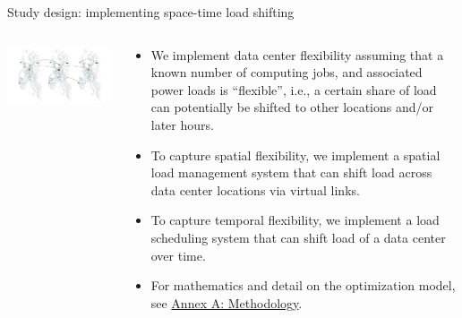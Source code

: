 \begin{frame}{Study design: implementing space-time load shifting}

  {\footnotesize
  \begin{columns}[T]
  
  \hspace{-1.5cm}
  \begin{column}{10cm}
  \vspace{0.3cm}
  \includegraphics[width=11.5cm]{images/spatial-temporal-vlinks.png}
  \end{column}

  \begin{column}{6cm}
  \begin{itemize}
    \item We implement data center flexibility assuming that a known number of computing jobs, and associated power loads is \enquote{flexible}, i.e., a certain share of load can potentially be shifted to other locations and/or later hours.
    \item To capture spatial flexibility, we implement a spatial load management system that can shift load across data center locations via virtual links.
    \item To capture temporal flexibility, we implement a load scheduling system that can shift load of a data center over time.
    \item For mathematics and detail on the optimization model, see \alert{\hyperlink{methodology}{Annex A: Methodology}}.
  \end{itemize}

  \end{column}
  \end{columns}
  }
\end{frame}



